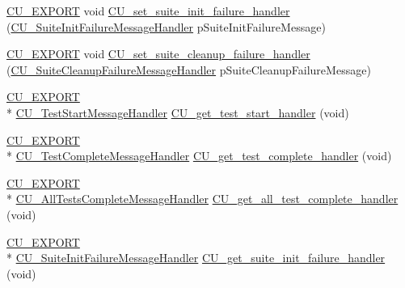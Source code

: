 \begin{DoxyCompactItemize}
\item 
\hyperlink{group___framework_ga22e538403fdee24be3388ab473fe64d5}{C\+U\+\_\+\+E\+X\+P\+O\+R\+T} void \hyperlink{group___framework_ga26036d28d4635ce2b87258d2dc328afa}{C\+U\+\_\+set\+\_\+suite\+\_\+init\+\_\+failure\+\_\+handler} (\hyperlink{group___framework_ga53faf49a6045a1fc32c5a0287b800b65}{C\+U\+\_\+\+Suite\+Init\+Failure\+Message\+Handler} p\+Suite\+Init\+Failure\+Message)
\item 
\hyperlink{group___framework_ga22e538403fdee24be3388ab473fe64d5}{C\+U\+\_\+\+E\+X\+P\+O\+R\+T} void \hyperlink{group___framework_gadd76507e33f51ce0c257593187524a37}{C\+U\+\_\+set\+\_\+suite\+\_\+cleanup\+\_\+failure\+\_\+handler} (\hyperlink{group___framework_ga67a720062975e6b7f97df16a1e8e10ce}{C\+U\+\_\+\+Suite\+Cleanup\+Failure\+Message\+Handler} p\+Suite\+Cleanup\+Failure\+Message)
\item 
\hyperlink{group___framework_ga22e538403fdee24be3388ab473fe64d5}{C\+U\+\_\+\+E\+X\+P\+O\+R\+T} \\*
\hyperlink{group___framework_ga3330df7f5c95933f4ba21c648933c928}{C\+U\+\_\+\+Test\+Start\+Message\+Handler} \hyperlink{group___framework_gaa68ed834a6a3c4b1bfd5beaa9b40a735}{C\+U\+\_\+get\+\_\+test\+\_\+start\+\_\+handler} (void)
\item 
\hyperlink{group___framework_ga22e538403fdee24be3388ab473fe64d5}{C\+U\+\_\+\+E\+X\+P\+O\+R\+T} \\*
\hyperlink{group___framework_ga2c11da75531b097ca037223489bf02be}{C\+U\+\_\+\+Test\+Complete\+Message\+Handler} \hyperlink{group___framework_ga98c5d999807279aa1960cbd2b3645f82}{C\+U\+\_\+get\+\_\+test\+\_\+complete\+\_\+handler} (void)
\item 
\hyperlink{group___framework_ga22e538403fdee24be3388ab473fe64d5}{C\+U\+\_\+\+E\+X\+P\+O\+R\+T} \\*
\hyperlink{group___framework_ga5c8cffc5ce2801990436b3e6992bf770}{C\+U\+\_\+\+All\+Tests\+Complete\+Message\+Handler} \hyperlink{group___framework_gaaa8c23572f049b78a48eaad6add84f5a}{C\+U\+\_\+get\+\_\+all\+\_\+test\+\_\+complete\+\_\+handler} (void)
\item 
\hyperlink{group___framework_ga22e538403fdee24be3388ab473fe64d5}{C\+U\+\_\+\+E\+X\+P\+O\+R\+T} \\*
\hyperlink{group___framework_ga53faf49a6045a1fc32c5a0287b800b65}{C\+U\+\_\+\+Suite\+Init\+Failure\+Message\+Handler} \hyperlink{group___framework_ga9b9f86b2d875553995daf07baea7db3b}{C\+U\+\_\+get\+\_\+suite\+\_\+init\+\_\+failure\+\_\+handler} (void)
\item 

\end{DoxyCompactItemize}
